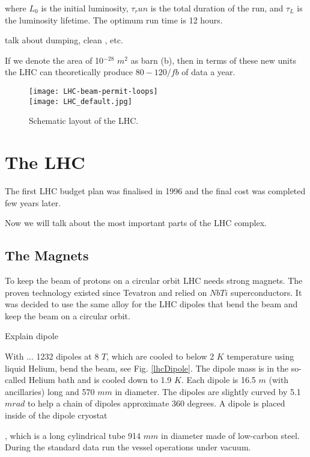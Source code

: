 \noindent where $L_0$ is the initial luminosity, $\tau_run$ is the total duration of the run, and $\tau_L$ is the luminosity lifetime. The optimum run time is 12 hours. 

talk about dumping, clean , etc.

If we denote the area of 10$^{-28}$ $m^2$ as barn (b), then in terms of these new units the LHC can theoretically produce $80-120/fb$ of data a year. 



\begin{figure}[H]
  \centering
  \texttt{[image: LHC-beam-permit-loops]}\\
  \texttt{[image: LHC\_default.jpg]}
  \caption {Schematic layout of the LHC.}
  \label{lhcmap}
\end{figure}


\section{The LHC}\label{sec:lhc}
The first LHC budget plan was finalised in 1996 and the final cost was completed few years later. 


Now we will talk about the most important parts of the LHC complex.


 
\subsection{The Magnets}\label{sec:magnets}
To keep the beam of protons on a circular orbit LHC needs strong magnets. The proven technology existed since Tevatron and relied on $NbTi$ superconductors. It was decided to use the same alloy for the LHC dipoles that bend the beam and keep the beam on a circular orbit. 

Explain dipole


With ... 1232 dipoles at 8 $T$, which are cooled to below 2 $K$ temperature using liquid Helium, bend the beam, see Fig. \ref{lhcDipole}. The dipole mass is in the so-called Helium bath and is cooled down to 1.9 $K$. Each dipole is 16.5 $m$ (with ancillaries) long and 570 $mm$ in diameter. The dipoles are slightly curved by 5.1 $mrad$ to help a chain of dipoles approximate 360 degrees. A dipole is placed inside of the dipole cryostat

, which is a long cylindrical tube 914 $mm$ in diameter made of low-carbon steel. During the standard data run the vessel operations under vacuum. 


